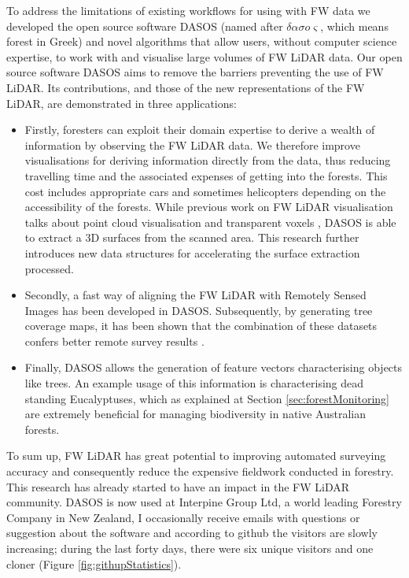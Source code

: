 \documentclass{subfiles}
\begin{document}
\par To address the limitations of existing workflows for using with FW data we developed the open source software DASOS (named after $\delta \alpha \sigma o \varsigma$, which means forest in Greek) and novel algorithms that allow users, without computer science expertise, to work with and visualise large volumes of FW LiDAR data. Our open source software DASOS aims to remove the barriers preventing the use of FW LiDAR. Its contributions, and those of the new representations of the FW LiDAR, are demonstrated in three applications:

\begin{itemize}
\item Firstly, foresters can exploit their domain expertise to derive a wealth of information by observing the FW LiDAR data. We therefore improve visualisations for deriving information directly from the data, thus reducing travelling time and the associated expenses of getting into the forests. This cost includes appropriate cars and sometimes helicopters depending on the accessibility of the forests. While previous work on FW LiDAR visualisation talks about point cloud visualisation \cite{Isenburg2012Pulsewaves} and transparent voxels \cite{Persson2005}, DASOS is able to extract a 3D surfaces from the scanned area. This research further introduces new data structures for accelerating the surface extraction processed. 

\item Secondly, a fast way of aligning the FW LiDAR with Remotely Sensed Images has been developed in DASOS. Subsequently, by generating tree coverage maps, it has been shown that the combination of these datasets confers better remote survey results \cite{Miltiadou2015}.


\item Finally, DASOS allows the generation of feature vectors characterising objects like trees. An example usage of this information is characterising dead standing Eucalyptuses, which as explained at Section \ref{sec:forestMonitoring} are extremely beneficial for managing biodiversity in native Australian forests. 

\end{itemize}



\par To sum up, FW LiDAR has great potential to improving automated surveying accuracy and consequently reduce the expensive fieldwork conducted in forestry. This research has already started to have an impact in the FW LiDAR community. DASOS is now used at Interpine Group Ltd, a world leading Forestry Company in New Zealand, I occasionally receive emails with questions or suggestion about the software and according to github the visitors are slowly increasing; during the last forty days, there were six unique visitors and one cloner (Figure \ref{fig:githupStatistics}).
\end{document}
